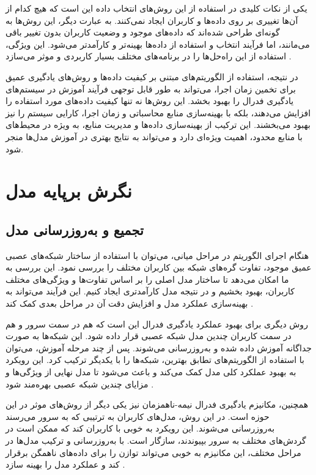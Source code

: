 یکی از نکات کلیدی در استفاده از این روش‌های انتخاب داده این است که هیچ کدام از آن‌ها تغییری بر روی داده‌ها و کاربران ایجاد نمی‌کنند. به عبارت دیگر، این روش‌ها به گونه‌ای طراحی شده‌اند که داده‌های موجود و وضعیت کاربران بدون تغییر باقی می‌مانند، اما فرآیند انتخاب و استفاده از داده‌ها بهینه‌تر و کارآمدتر می‌شود. این ویژگی، استفاده از این راه‌حل‌ها را در برنامه‌های مختلف بسیار کاربردی و موثر می‌سازد
\cite{zeng2022local}.

در نتیجه، استفاده از الگوریتم‌های مبتنی بر کیفیت داده‌ها و روش‌های یادگیری عمیق برای تخمین زمان اجرا، می‌تواند به طور قابل توجهی فرآیند آموزش در سیستم‌های یادگیری فدرال را بهبود بخشد. این روش‌ها نه تنها کیفیت داده‌های مورد استفاده را افزایش می‌دهند، بلکه با بهینه‌سازی منابع محاسباتی و زمان اجرا، کارایی سیستم را نیز بهبود می‌بخشند. این ترکیب از بهینه‌سازی داده‌ها و مدیریت منابع، به ویژه در محیط‌های با منابع محدود، اهمیت ویژه‌ای دارد و می‌تواند به نتایج بهتری در آموزش مدل‌ها منجر شود.


\section{نگرش برپایه مدل}
\subsection{
	تجمیع و به‌روزرسانی مدل%
	\protect
}	
هنگام اجرای الگوریتم در مراحل میانی، می‌توان با استفاده از ساختار شبکه‌های عصبی عمیق موجود، تفاوت گره‌های شبکه بین کاربران مختلف را بررسی نمود. این بررسی به ما امکان می‌دهد تا ساختار مدل اصلی را بر اساس تفاوت‌ها و ویژگی‌های مختلف کاربران، بهبود بخشیم و در نتیجه مدل کارآمدتری ایجاد کنیم. این فرآیند می‌تواند به بهینه‌سازی عملکرد مدل و افزایش دقت آن در مراحل بعدی کمک کند
\cite{sannara2021federated}.

روش دیگری برای بهبود عملکرد یادگیری فدرال این است که هم در سمت سرور و هم در سمت کاربران چندین مدل شبکه عصبی قرار داده شود. این شبکه‌ها به صورت جداگانه آموزش داده شده و به‌روزرسانی می‌شوند. پس از چند مرحله آموزش، می‌توان با استفاده از الگوریتم‌های تطابق بهترین، شبکه‌ها را با یکدیگر ترکیب کرد. این رویکرد به بهبود عملکرد کلی مدل کمک می‌کند و باعث می‌شود تا مدل نهایی از ویژگی‌ها و مزایای چندین شبکه عصبی بهره‌مند شود
\cite{qin2021mlmg}.

همچنین، مکانیزم یادگیری فدرال نیمه-ناهمزمان%
نیز یکی دیگر از روش‌های موثر در این حوزه است. در این روش، مدل‌های کاربران به ترتیبی که به سرور می‌رسند به‌روزرسانی می‌شوند. این رویکرد به خوبی با کاربران کند%
که ممکن است در گردش‌های مختلف به سرور بپیوندند، سازگار است. با به‌روزرسانی و ترکیب مدل‌ها در مراحل مختلف، این مکانیزم به خوبی می‌تواند توازن را برای داده‌های ناهمگن برقرار کند و عملکرد مدل را بهینه سازد
\cite{ma2021fedsa, ma2022state}.

